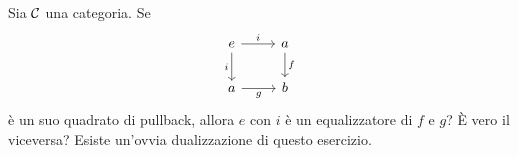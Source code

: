 \begin{esercizio}
Sia \(\mathcal C\) una categoria. Se
\[\begin{tikzcd}
e \ar["i", r] \ar["i", swap, d] & a \ar["f", d] \\
a \ar["g", swap, r]             & b
\end{tikzcd}\]
è un suo quadrato di pullback, allora \(e\) con \(i\) è un equalizzatore di \(f\) e \(g\)? È vero il viceversa? Esiste un'ovvia dualizzazione di questo esercizio.
\end{esercizio}
